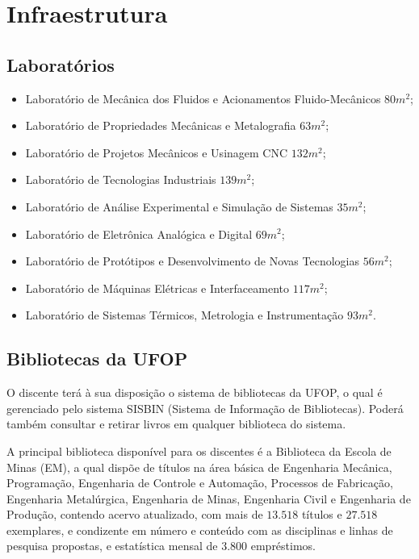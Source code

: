 \chapter{Infraestrutura} 
\label{cap:07} 
%
\section{Laboratórios}
\begin{itemize}
	\item Laboratório de Mecânica dos Fluidos e Acionamentos Fluido-Mecânicos $80m^{2}$;
	\item Laboratório de Propriedades Mecânicas e Metalografia $63m^{2}$;
	\item Laboratório de Projetos Mecânicos e Usinagem CNC $132m^{2}$;
	\item Laboratório de Tecnologias Industriais $139m^{2}$;
	\item Laboratório de Análise Experimental e Simulação de Sistemas $35m^{2}$;
	\item Laboratório de Eletrônica Analógica e Digital $69m^{2}$;
	\item Laboratório de Protótipos e Desenvolvimento de Novas Tecnologias $56m^{2}$;
	\item Laboratório de Máquinas Elétricas e Interfaceamento $117m^{2}$;
	\item Laboratório de Sistemas Térmicos, Metrologia e Instrumentação $93m^{2}$.
\end{itemize}

\section{Bibliotecas da UFOP}
O discente terá à sua disposição o sistema de bibliotecas da UFOP, o qual é gerenciado pelo sistema SISBIN (Sistema de Informação de Bibliotecas). Poderá também consultar e retirar livros em qualquer biblioteca do sistema.

A principal biblioteca disponível para os discentes é a Biblioteca da Escola de Minas (EM), a qual dispõe de títulos na área básica de Engenharia Mecânica, Programação, Engenharia de Controle e Automação, Processos de Fabricação, Engenharia Metalúrgica, Engenharia de Minas, Engenharia Civil e Engenharia de Produção, contendo acervo atualizado, com mais de $13.518$ títulos e $27.518$ exemplares, e condizente em número e conteúdo com as disciplinas e linhas de pesquisa propostas, e estatística mensal de $3.800$ empréstimos.


